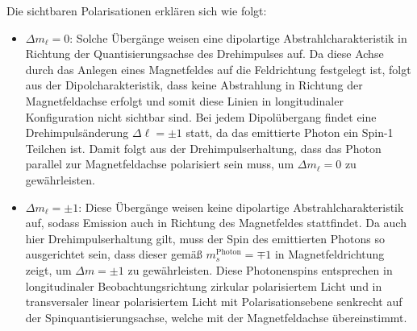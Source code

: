 \documentclass[11pt, a4paper]{article}
\begin{document}
\noindent
Die sichtbaren Polarisationen erklären sich wie folgt:
\begin{itemize}
	\item $\Delta m_\ell = 0$: Solche Übergänge weisen eine dipolartige Abstrahlcharakteristik in Richtung der Quantisierungsachse des Drehimpulses auf.
	Da diese Achse durch das Anlegen eines Magnetfeldes auf die Feldrichtung festgelegt ist, folgt aus der Dipolcharakteristik, dass keine Abstrahlung in Richtung der Magnetfeldachse erfolgt und somit diese Linien in longitudinaler Konfiguration nicht sichtbar sind.
	Bei jedem Dipolübergang findet eine Drehimpulsänderung $\Delta \ell = \pm 1$ statt, da das emittierte Photon ein Spin-1 Teilchen ist.
	Damit folgt aus der Drehimpulserhaltung, dass das Photon parallel zur Magnetfeldachse polarisiert sein muss, um $\Delta m_\ell = 0$ zu gewährleisten.
	
	\item $\Delta m_\ell = \pm 1$: Diese Übergänge weisen keine dipolartige Abstrahlcharakteristik auf, sodass Emission auch in Richtung des Magnetfeldes stattfindet.
	Da auch hier Drehimpulserhaltung gilt, muss der Spin des emittierten Photons so ausgerichtet sein, dass dieser gemäß $m_s^\mathrm{Photon} = \mp 1$ in Magnetfeldrichtung zeigt, um $\Delta m = \pm 1$ zu gewährleisten.
	Diese Photonenspins entsprechen in longitudinaler Beobachtungsrichtung zirkular polarisiertem Licht und in transversaler linear polarisiertem Licht mit Polarisationsebene senkrecht auf der Spinquantisierungsachse, welche mit der Magnetfeldachse übereinstimmt.
\end{itemize}
\end{document}
